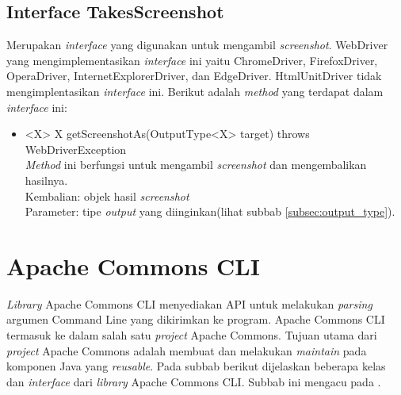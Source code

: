 \subsection{Interface TakesScreenshot}
\label{subsec:takes_screenshot}
Merupakan \textit{interface} yang digunakan untuk mengambil \textit{screenshot}. WebDriver yang mengimplementasikan \textit{interface} ini yaitu ChromeDriver, FirefoxDriver, OperaDriver, InternetExplorerDriver, dan  EdgeDriver. HtmlUnitDriver tidak mengimplentasikan \textit{interface} ini. Berikut adalah \textit{method} yang terdapat dalam \textit{interface} ini:
\begin{itemize}
\item <X> X getScreenshotAs(OutputType<X> target) throws WebDriverException\\
\textit{Method} ini berfungsi untuk mengambil \textit{screenshot} dan mengembalikan hasilnya.\\
Kembalian: objek hasil \textit{screenshot} \\
Parameter: tipe \textit{output} yang diinginkan(lihat subbab \ref{subsec:output_type}).
\end{itemize}


\section{Apache Commons CLI}
\label{subsec:apache_cli}
\textit{Library} Apache Commons CLI menyediakan API untuk melakukan \textit{parsing} argumen Command Line yang dikirimkan ke program\cite{Apache_Commons_CLI}. Apache Commons CLI termasuk ke dalam salah satu \textit{project} Apache Commons. Tujuan utama dari \textit{project} Apache Commons adalah membuat dan melakukan \textit{maintain} pada komponen Java yang \textit{reusable}. Pada subbab berikut dijelaskan beberapa kelas dan \textit{interface} dari \textit{library} Apache Commons CLI. Subbab ini mengacu pada \cite{Apache_java_doc}.

